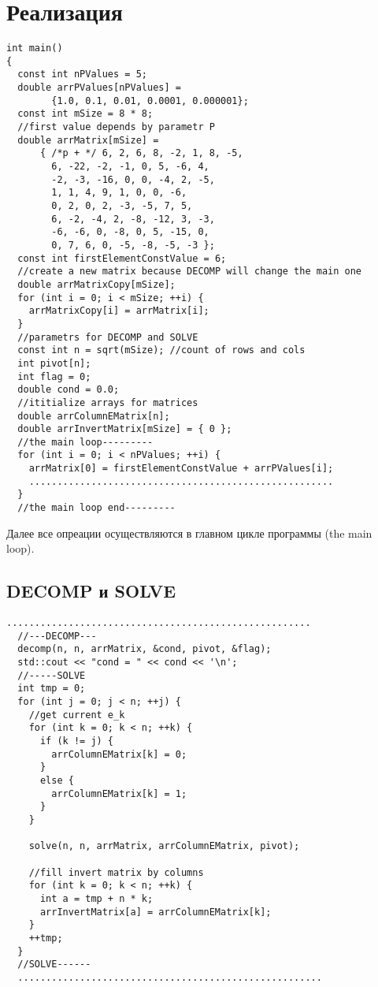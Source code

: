 \documentclass[a4paper,11pt]{article}
\begin{document}
\section{Реализация}
\begin{lstlisting}[label=preparing,caption=Подготовительная часть]
int main()
{
  const int nPValues = 5;
  double arrPValues[nPValues] =
        {1.0, 0.1, 0.01, 0.0001, 0.000001};
  const int mSize = 8 * 8;
  //first value depends by parametr P
  double arrMatrix[mSize] =
      { /*p + */ 6, 2, 6, 8, -2, 1, 8, -5,
        6, -22, -2, -1, 0, 5, -6, 4,
        -2, -3, -16, 0, 0, -4, 2, -5,
        1, 1, 4, 9, 1, 0, 0, -6,
        0, 2, 0, 2, -3, -5, 7, 5,
        6, -2, -4, 2, -8, -12, 3, -3,
        -6, -6, 0, -8, 0, 5, -15, 0,
        0, 7, 6, 0, -5, -8, -5, -3 };
  const int firstElementConstValue = 6;
  //create a new matrix because DECOMP will change the main one
  double arrMatrixCopy[mSize];
  for (int i = 0; i < mSize; ++i) {
    arrMatrixCopy[i] = arrMatrix[i];
  }
  //parametrs for DECOMP and SOLVE
  const int n = sqrt(mSize); //count of rows and cols
  int pivot[n];
  int flag = 0;
  double cond = 0.0;
  //ititialize arrays for matrices
  double arrColumnEMatrix[n];
  double arrInvertMatrix[mSize] = { 0 };
  //the main loop---------
  for (int i = 0; i < nPValues; ++i) {
    arrMatrix[0] = firstElementConstValue + arrPValues[i];
    ......................................................
  }
  //the main loop end---------
\end{lstlisting}
Далее все опреации осуществляются в главном цикле программы (the main loop).

\subsection{DECOMP и SOLVE}
\begin{lstlisting}[label=decompsolve, caption=DECOMP and SOLVE]
  ......................................................
  //---DECOMP---
  decomp(n, n, arrMatrix, &cond, pivot, &flag);
  std::cout << "cond = " << cond << '\n';
  //-----SOLVE
  int tmp = 0;
  for (int j = 0; j < n; ++j) {
    //get current e_k
    for (int k = 0; k < n; ++k) {
      if (k != j) {
        arrColumnEMatrix[k] = 0;
      }
      else {
        arrColumnEMatrix[k] = 1;
      }
    }

    solve(n, n, arrMatrix, arrColumnEMatrix, pivot);

    //fill invert matrix by columns
    for (int k = 0; k < n; ++k) {
      int a = tmp + n * k;
      arrInvertMatrix[a] = arrColumnEMatrix[k];
    }
    ++tmp;
  }
  //SOLVE------
  ......................................................
\end{lstlisting}
\end{document}
